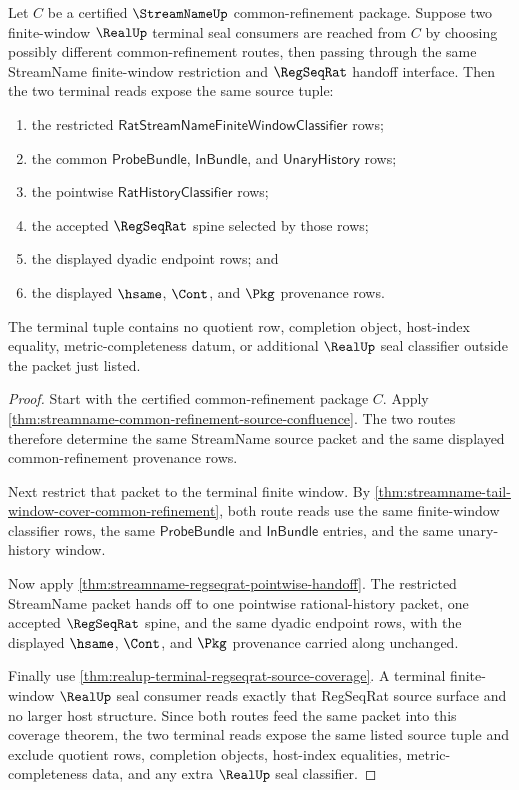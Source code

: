 \begin{theorem}
\label{thm:streamname-common-refinement-terminal-route-determinacy}
Let $C$ be a certified $\StreamNameUp$ common-refinement package. Suppose two
finite-window $\RealUp$ terminal seal consumers are reached from $C$ by
choosing possibly different common-refinement routes, then passing through the
same StreamName finite-window restriction and $\RegSeqRat$ handoff interface.
Then the two terminal reads expose the same source tuple:
\begin{enumerate}
  \item the restricted
  $\mathsf{RatStreamNameFiniteWindowClassifier}$ rows;
  \item the common $\mathsf{ProbeBundle}$, $\mathsf{InBundle}$, and
  $\mathsf{UnaryHistory}$ rows;
  \item the pointwise $\mathsf{RatHistoryClassifier}$ rows;
  \item the accepted $\RegSeqRat$ spine selected by those rows;
  \item the displayed dyadic endpoint rows; and
  \item the displayed $\hsame$, $\Cont$, and $\Pkg$ provenance rows.
\end{enumerate}
The terminal tuple contains no quotient row, completion object, host-index
equality, metric-completeness datum, or additional $\RealUp$ seal classifier
outside the packet just listed.
\end{theorem}
\begin{proof}
Start with the certified common-refinement package $C$. Apply
\autoref{thm:streamname-common-refinement-source-confluence}. The two routes
therefore determine the same StreamName source packet and the same displayed
common-refinement provenance rows.

Next restrict that packet to the terminal finite window. By
\autoref{thm:streamname-tail-window-cover-common-refinement}, both route reads
use the same finite-window classifier rows, the same $\mathsf{ProbeBundle}$ and
$\mathsf{InBundle}$ entries, and the same unary-history window.

Now apply \autoref{thm:streamname-regseqrat-pointwise-handoff}. The restricted
StreamName packet hands off to one pointwise rational-history packet, one
accepted $\RegSeqRat$ spine, and the same dyadic endpoint rows, with the
displayed $\hsame$, $\Cont$, and $\Pkg$ provenance carried along unchanged.

Finally use \autoref{thm:realup-terminal-regseqrat-source-coverage}. A terminal
finite-window $\RealUp$ seal consumer reads exactly that RegSeqRat source
surface and no larger host structure. Since both routes feed the same packet
into this coverage theorem, the two terminal reads expose the same listed
source tuple and exclude quotient rows, completion objects, host-index
equalities, metric-completeness data, and any extra $\RealUp$ seal classifier.
\end{proof}

